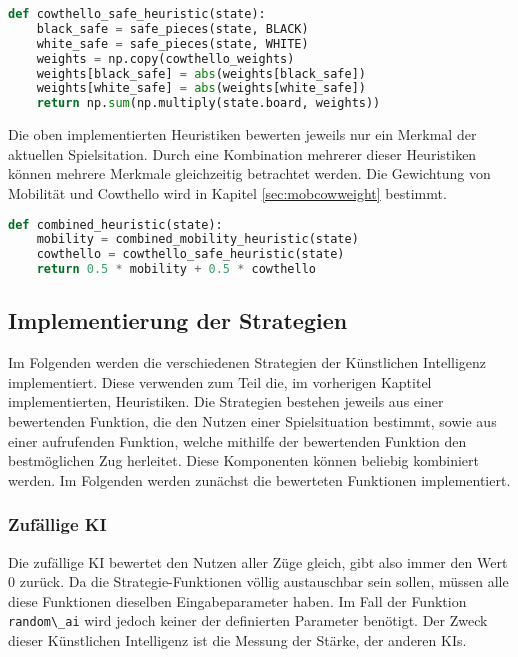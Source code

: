\begin{lstlisting}[language=Python]
def cowthello_safe_heuristic(state):
    black_safe = safe_pieces(state, BLACK)
    white_safe = safe_pieces(state, WHITE)
    weights = np.copy(cowthello_weights)
    weights[black_safe] = abs(weights[black_safe])
    weights[white_safe] = abs(weights[white_safe])
    return np.sum(np.multiply(state.board, weights))
\end{lstlisting}

Die oben implementierten Heuristiken bewerten jeweils nur ein Merkmal
der aktuellen Spielsitation. Durch eine Kombination mehrerer dieser
Heuristiken können mehrere Merkmale gleichzeitig betrachtet werden. Die
Gewichtung von Mobilität und Cowthello wird in Kapitel
\ref{sec:mobcowweight} bestimmt.

\begin{lstlisting}[language=Python]
def combined_heuristic(state):
    mobility = combined_mobility_heuristic(state)
    cowthello = cowthello_safe_heuristic(state)
    return 0.5 * mobility + 0.5 * cowthello
\end{lstlisting}

\hypertarget{implementierung-der-strategien}{%
\subsection{Implementierung der
Strategien}\label{implementierung-der-strategien}}

Im Folgenden werden die verschiedenen Strategien der Künstlichen
Intelligenz implementiert. Diese verwenden zum Teil die, im vorherigen
Kaptitel implementierten, Heuristiken. Die Strategien bestehen jeweils
aus einer bewertenden Funktion, die den Nutzen einer Spielsituation
bestimmt, sowie aus einer aufrufenden Funktion, welche mithilfe der
bewertenden Funktion den bestmöglichen Zug herleitet. Diese Komponenten
können beliebig kombiniert werden. Im Folgenden werden zunächst die
bewerteten Funktionen implementiert.

\hypertarget{zufuxe4llige-ki}{%
\subsubsection{Zufällige KI}\label{zufuxe4llige-ki}}

Die zufällige KI bewertet den Nutzen aller Züge gleich, gibt also immer
den Wert \(0\) zurück. Da die Strategie-Funktionen völlig austauschbar
sein sollen, müssen alle diese Funktionen dieselben Eingabeparameter
haben. Im Fall der Funktion \passthrough{\lstinline!random\_ai!} wird
jedoch keiner der definierten Parameter benötigt. Der Zweck dieser
Künstlichen Intelligenz ist die Messung der Stärke, der anderen KIs.

